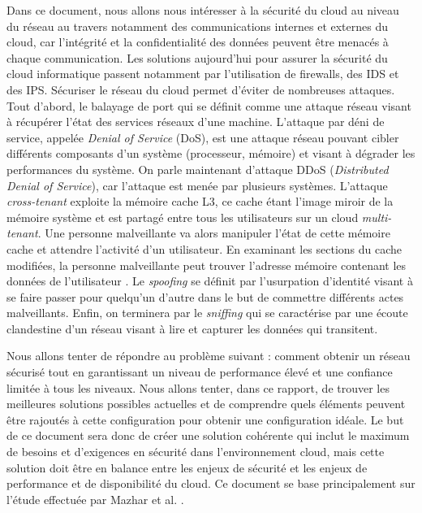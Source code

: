 Dans ce document, nous allons nous intéresser à la sécurité du cloud au niveau
du réseau au travers notamment des communications internes et externes du
cloud, car l'intégrité et la confidentialité des données peuvent être menacés à
chaque communication. Les solutions aujourd'hui pour assurer la sécurité du
cloud informatique passent notamment par l'utilisation de \gls{firewalls}, des \gls{IDS} et des \gls{IPS}. Sécuriser le réseau du cloud permet d'éviter de nombreuses attaques. 
Tout d'abord, le balayage de port qui se définit comme une attaque réseau visant à récupérer l'état des services réseaux d'une machine. L'attaque par déni de service, appelée \textit{Denial of Service} (DoS), est une attaque réseau pouvant cibler différents composants d'un système (processeur, mémoire) et visant à dégrader les performances du système. On parle maintenant d'attaque DDoS (\textit{Distributed Denial of Service}), car l'attaque est menée par plusieurs systèmes. L'attaque \textit{cross-tenant} exploite la mémoire cache L3, ce cache étant l’image miroir de la mémoire système et est partagé entre tous les utilisateurs sur un cloud \textit{multi-tenant}. Une personne malveillante va alors manipuler l’état de cette mémoire cache et attendre l’activité d’un utilisateur. En examinant les sections du cache modifiées, la personne malveillante peut trouver l’adresse mémoire contenant les données de l’utilisateur \cite{new_attack_cloud}. Le \textit{spoofing} se définit par l'usurpation d'identité visant à se faire passer pour quelqu'un d'autre dans le but de commettre différents actes malveillants. Enfin, on terminera par le \textit{sniffing} qui se caractérise par une écoute clandestine d'un réseau visant à lire et capturer les données qui transitent.

Nous allons tenter de répondre au problème suivant : comment obtenir un réseau
sécurisé tout en garantissant un niveau de performance élevé et une confiance
limitée à tous les niveaux. Nous allons tenter, dans ce rapport, de trouver les
meilleures solutions possibles actuelles et de comprendre quels éléments
peuvent être rajoutés à cette configuration pour obtenir une configuration
idéale. Le but de ce document sera donc de créer une solution cohérente qui
inclut le maximum de besoins et d’exigences en sécurité dans l’environnement cloud, mais cette solution doit être en balance entre les enjeux de sécurité et les enjeux de performance et de disponibilité du cloud. Ce document se base principalement sur l'étude effectuée par Mazhar et al. \cite{security_cloud_survey}.

